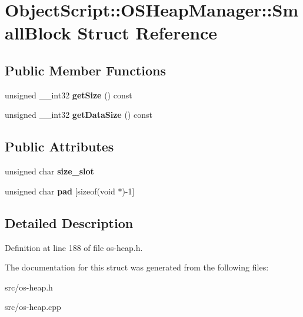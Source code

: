 \hypertarget{struct_object_script_1_1_o_s_heap_manager_1_1_small_block}{}\section{Object\+Script\+:\+:O\+S\+Heap\+Manager\+:\+:Small\+Block Struct Reference}
\label{struct_object_script_1_1_o_s_heap_manager_1_1_small_block}
\subsection*{Public Member Functions}
\begin{DoxyCompactItemize}
\item 
unsigned \+\_\+\+\_\+int32 {\bfseries get\+Size} () const \hypertarget{struct_object_script_1_1_o_s_heap_manager_1_1_small_block_afa766e4e9d9887f7f57fa082e5227fad}{}\label{struct_object_script_1_1_o_s_heap_manager_1_1_small_block_afa766e4e9d9887f7f57fa082e5227fad}

\item 
unsigned \+\_\+\+\_\+int32 {\bfseries get\+Data\+Size} () const \hypertarget{struct_object_script_1_1_o_s_heap_manager_1_1_small_block_ac411007d8a32d8fb9c7a0944d98aae83}{}\label{struct_object_script_1_1_o_s_heap_manager_1_1_small_block_ac411007d8a32d8fb9c7a0944d98aae83}

\end{DoxyCompactItemize}
\subsection*{Public Attributes}
\begin{DoxyCompactItemize}
\item 
unsigned char {\bfseries size\+\_\+slot}\hypertarget{struct_object_script_1_1_o_s_heap_manager_1_1_small_block_ac2f610679b04f05ea9fffa609283c307}{}\label{struct_object_script_1_1_o_s_heap_manager_1_1_small_block_ac2f610679b04f05ea9fffa609283c307}

\item 
unsigned char {\bfseries pad} \mbox{[}sizeof(void $\ast$)-\/1\mbox{]}\hypertarget{struct_object_script_1_1_o_s_heap_manager_1_1_small_block_ade8a6cd80e7416410f17b987eb1a34b4}{}\label{struct_object_script_1_1_o_s_heap_manager_1_1_small_block_ade8a6cd80e7416410f17b987eb1a34b4}

\end{DoxyCompactItemize}


\subsection{Detailed Description}


Definition at line 188 of file os-\/heap.\+h.



The documentation for this struct was generated from the following files\+:\begin{DoxyCompactItemize}
\item 
src/os-\/heap.\+h\item 
src/os-\/heap.\+cpp\end{DoxyCompactItemize}
